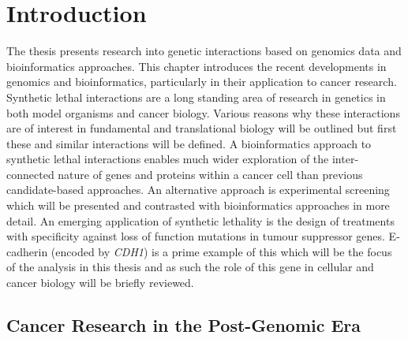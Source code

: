 \chapter{Introduction}
\label{chap:intro}



The thesis presents research into genetic interactions based on genomics data and bioinformatics approaches. This chapter introduces the recent developments in genomics and bioinformatics, particularly in their application to cancer research. Synthetic lethal interactions are a long standing area of research in genetics in both model organisms and cancer biology. Various reasons why these interactions are of interest in fundamental and translational biology will be outlined but first these and similar interactions will be defined. A bioinformatics approach to synthetic lethal interactions enables much wider exploration of the inter-connected nature of genes and proteins within a cancer cell than previous candidate-based approaches. An alternative approach is experimental screening which will be presented and contrasted with bioinformatics approaches in more detail.  An emerging application of synthetic lethality is the design of treatments with specificity against loss of function mutations in tumour suppressor genes. E-cadherin (encoded by \textit{CDH1}) is a prime example of this which will be the focus of the analysis in this thesis and as such the role of this gene in cellular and cancer biology will be briefly reviewed.   



\section{Cancer Research in the Post-Genomic Era}

